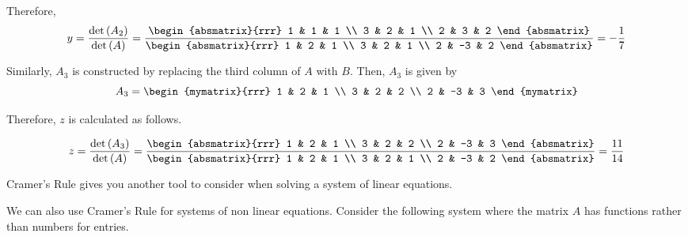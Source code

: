 \begin{solution}
Therefore, 
\begin{equation*}
y=\vspace{0.05in}\frac{\det \tup{A_{2}}}{\det \tup{A}} = \vspace{0.05in}\frac{\begin{absmatrix}{rrr}
1 & 1 & 1 \\
3 & 2 & 1 \\
2 & 3 & 2
\end{absmatrix} }{\begin{absmatrix}{rrr}
1 & 2 & 1 \\
3 & 2 & 1 \\
2 & -3 & 2
\end{absmatrix} }=-\vspace{0.05in}\frac{1}{7}
\end{equation*}

Similarly, $A_3$ is constructed by replacing the third column of $A$ with $B$. Then, $A_3$ is given by
\begin{equation*}
A_3
=
\begin{mymatrix}{rrr}
1 & 2 & 1 \\
3 & 2 & 2 \\
2 & -3 & 3
\end{mymatrix}
\end{equation*}

Therefore, $z$ is calculated as follows. 

\begin{equation*}
z=
\vspace{0.05in}\frac{\det \tup{A_{3}}}{\det \tup{A}}
=
\frac{\begin{absmatrix}{rrr}
1 & 2 & 1 \\
3 & 2 & 2 \\
2 & -3 & 3
\end{absmatrix} }{\begin{absmatrix}{rrr}
1 & 2 & 1 \\
3 & 2 & 1 \\
2 & -3 & 2
\end{absmatrix} }=\frac{11}{14}
\end{equation*}
\end{solution}

Cramer's Rule gives you another tool to consider when solving a system of linear equations.

We can also use Cramer's Rule for systems of non linear equations. Consider the following system 
where the matrix $A$ has functions rather than numbers for entries. 

